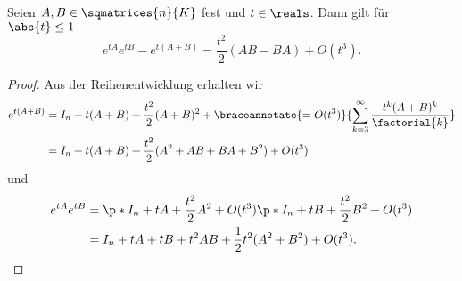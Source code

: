 \begin{satz}
  Seien \( A,B\in \sqmatrices{n}{K} \) fest und \( t\in \reals \). Dann gilt für \( \abs{t}\leq 1 \)
  \begin{equation*}
    e^{tA}e^{tB}-e^{t(A+B)}=\frac{t^2}{2}(AB-BA)+O(t^3).
  \end{equation*}
\end{satz}
\begin{proof}
  Aus der Reihenentwicklung erhalten wir
  \begin{align*}
    e^{t(A+B)}&=I_n+t(A+B)+\frac{t^2}{2}(A+B)^2+\braceannotate{=O(t^3)}{\sum_{k=3}^{\infty}\frac{t^k(A+B)^k}{\factorial{k}}}\\
    &=I_n+t(A+B)+\frac{t^2}{2}(A^2+AB+BA+B^2)+O(t^3)
  \end{align*}
  und
  \begin{align*}
    e^{tA}e^{tB}&=\p*{I_n+tA+\frac{t^2}{2}A^2+O(t^3)}\p*{I_n+tB+\frac{t^2}{2}B^2+O(t^3)}\\
    &=I_n+tA+tB+t^2AB+\frac{1}{2}t^2(A^2+B^2)+O(t^3).
  \end{align*}
\end{proof}
